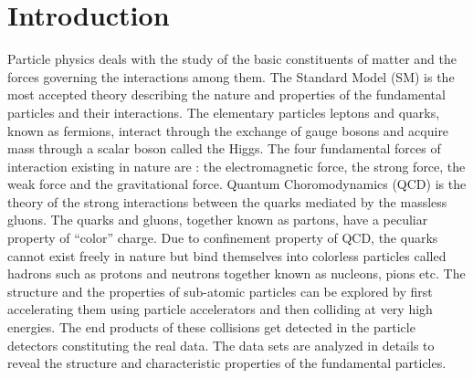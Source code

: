 \chapter{Introduction}
\label{chap:Introduction}

Particle physics deals with the study of the basic constituents of matter and the forces governing the interactions among them. The Standard Model (SM) is the most accepted theory describing the nature and properties of the fundamental particles and their interactions. The elementary particles leptons and quarks, known as fermions, interact through the exchange of gauge bosons and acquire mass through a scalar boson called the Higgs. The four fundamental forces of interaction existing in nature are : the electromagnetic force, the strong force, the weak force and the gravitational force. Quantum Choromodynamics (QCD) is the theory of the strong interactions between the quarks mediated by the massless gluons. The quarks and gluons, together known as partons, have a peculiar property of ``color'' charge. Due to confinement property of QCD, the quarks cannot exist freely in nature but bind themselves into colorless particles called hadrons such as protons and neutrons together known as nucleons, pions etc. The structure and the properties of sub-atomic particles can be explored by first accelerating them using particle accelerators and then colliding at very high energies. The end products of these collisions get detected in the particle detectors constituting the real data. The data sets are analyzed in details to reveal the structure and characteristic properties of the fundamental particles.

